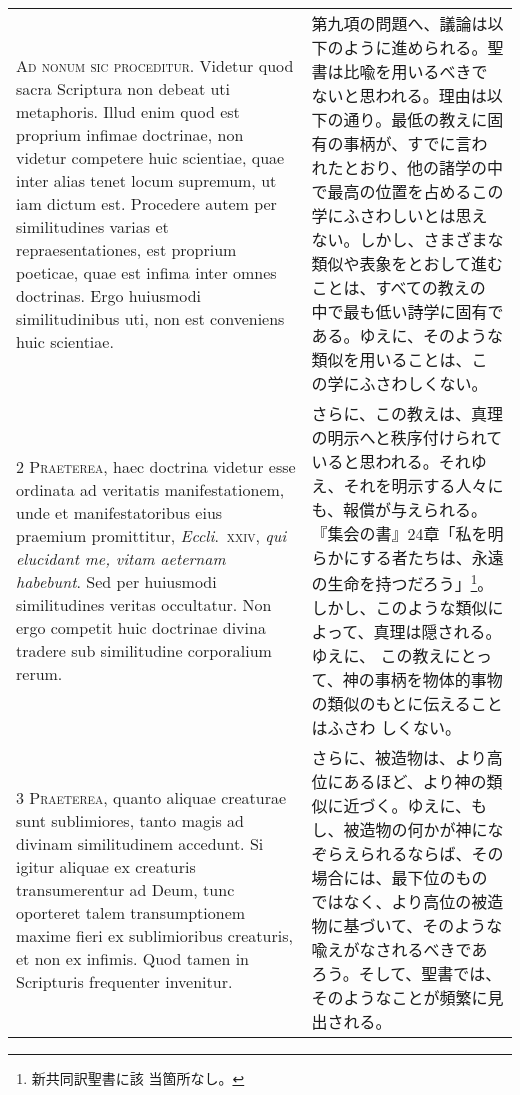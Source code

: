 \documentclass[10pt]{jsarticle}
\begin{document}
\begin{longtable}{p{21em}p{21em}}


{\Huge A}{\scshape d nonum sic proceditur}. Videtur quod sacra
Scriptura non debeat uti metaphoris. Illud enim quod est proprium
infimae doctrinae, non videtur competere huic scientiae, quae inter
alias tenet locum supremum, ut iam dictum est. Procedere autem per
similitudines varias et repraesentationes, est proprium poeticae, quae
est infima inter omnes doctrinas. Ergo huiusmodi similitudinibus uti,
non est conveniens huic scientiae.


&

第九項の問題へ、議論は以下のように進められる。聖書は比喩を用いるべきで
ないと思われる。理由は以下の通り。最低の教えに固有の事柄が、すでに言わ
れたとおり、他の諸学の中で最高の位置を占めるこの学にふさわしいとは思え
ない。しかし、さまざまな類似や表象をとおして進むことは、すべての教えの
中で最も低い詩学に固有である。ゆえに、そのような類似を用いることは、こ
の学にふさわしくない。



\\


{\scshape 2 Praeterea}, haec doctrina videtur esse ordinata ad
veritatis manifestationem, unde et manifestatoribus eius praemium
promittitur, {\itshape Eccli}.~{\scshape xxiv}, {\itshape qui
elucidant me, vitam aeternam habebunt}. Sed per huiusmodi
similitudines veritas occultatur. Non ergo competit huic doctrinae
divina tradere sub similitudine corporalium rerum.


&

さらに、この教えは、真理の明示へと秩序付けられていると思われる。それゆ
え、それを明示する人々にも、報償が与えられる。『集会の書』24章「私を明
らかにする者たちは、永遠の生命を持つだろう」\footnote{新共同訳聖書に該
当箇所なし。}。しかし、このような類似によって、真理は隠される。ゆえに、
この教えにとって、神の事柄を物体的事物の類似のもとに伝えることはふさわ
しくない。


\\


{\scshape 3 Praeterea}, quanto aliquae creaturae sunt sublimiores,
tanto magis ad divinam similitudinem accedunt. Si igitur aliquae ex
creaturis transumerentur ad Deum, tunc oporteret talem transumptionem
maxime fieri ex sublimioribus creaturis, et non ex infimis. Quod tamen
in Scripturis frequenter invenitur.


&

さらに、被造物は、より高位にあるほど、より神の類似に近づく。ゆえに、も
し、被造物の何かが神になぞらえられるならば、その場合には、最下位のもの
ではなく、より高位の被造物に基づいて、そのような喩えがなされるべきであ
ろう。そして、聖書では、そのようなことが頻繁に見出される。



\end{longtable}
\end{document}
